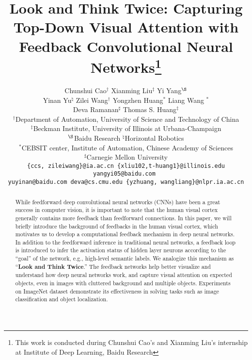 \documentclass[10pt,twocolumn,letterpaper]{article}
\begin{document}
\title{Look and Think Twice: Capturing Top-Down Visual Attention with Feedback Convolutional Neural Networks\thanks{This work is conducted during Chunshui Cao's and Xianming Liu's internship at Institute of Deep Learning, Baidu Research }}


\author{Chunshui Cao$^\dag$ \;\; Xianming Liu$^\ddag$ \;\; Yi Yang$^\S$ \;\; \\
Yinan Yu$^\natural$ \;\; Zilei Wang$^\dag$ \;\; Yongzhen Huang$^*$ \;\; Liang Wang $^*$ \;\; \\
Deva Ramanan$^\sharp$ \;\; Thomas S. Huang$^\ddag$ \\
$^\dag$Department of Automation, University of Science and Technology of China\\
$^\ddag$Beckman Institute, University of Illinois at Urbana-Champaign\\
$^\S$Baidu Research \quad $^\natural$Horizontal Robotics\\
$^*$CEBSIT center, Institute of Automation, Chinese Academy of Sciences\\
$^\sharp$Carnegie Mellon University \\
{\tt \small \{ccs, zileiwang\}@ia.ac.cn \;\; \{xliu102,t-huang1\}@illinois.edu \;\; yangyi05@baidu.com \;\;}\\
{\tt \small yuyinan@baidu.com \;\; deva@cs.cmu.edu \;\; \{yzhuang, wangliang\}@nlpr.ia.ac.cn\;\;}
}

\maketitle


\begin{abstract}
While feedforward deep convolutional neural networks (CNNs) have been a great success in computer vision, it is important to note that the human visual cortex generally contains more feedback than feedforward connections.
In this paper, we will briefly introduce the background of feedbacks in the human visual cortex, which motivates us to develop a computational feedback mechanism in deep neural networks.
In addition to the feedforward inference in traditional neural networks, a feedback loop is introduced to infer the activation status of hidden layer neurons according to the ``goal'' of the network, e.g., high-level semantic labels.
We analogize this mechanism as ``\textbf{Look and Think Twice}.''
The feedback networks help better visualize and understand how deep neural networks work, and capture visual attention on expected objects, even in images with cluttered background and multiple objects.
Experiments on ImageNet dataset demonstrate its effectiveness in solving tasks such as image classification and object localization.
\end{abstract}
\end{document}
